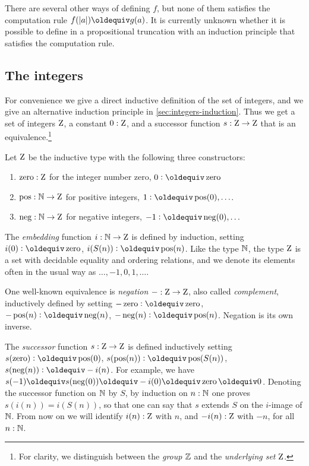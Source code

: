 \documentclass[a4paper,12pt]{amsart}
\begin{document}
There are several other ways of defining $f$, but none of them
satisfies the computation rule $f(\trunc a)\jdeq g(a)$. It is currently
unknown whether it is possible to define in {\UniMath} a propositional
truncation with an induction principle that satisfies the computation rule.


\subsection{The integers}
\label{sec:integers}

For convenience we give a direct inductive
definition of the set of integers, and we give
an alternative induction principle in \cref{sec:integers-induction}.
Thus we get a set of integers $\mathrm{Z}$, a constant $0:\mathrm{Z}$,
and a successor function $s:\mathrm{Z}\to\mathrm{Z}$
that is an equivalence.\footnote{%
  For clarity, we distinguish between the \emph{group} $\mathbb{Z}$
  and the \emph{underlying set} $\mathrm{Z}$.}

\begin{definition}\label{def:integers}
Let $\mathrm{Z}$ be the inductive type with the following three constructors:
\begin{enumerate}[topsep=0pt]
\item $\mathop{\mathrm{zero}}: \mathrm{Z}$ for the integer number zero,
$0 \defeq \zzero$
\item $\mathop{\mathrm{pos}}: \mathbb{N} \to \mathrm{Z}$ for positive {integers},
$1 \defeq \zpos(0),\ldots$.
\item $\mathop{\mathrm{neg}}: \mathbb{N} \to \mathrm{Z}$ for negative {integers},
$-1 \defeq \zneg(0),\ldots$
\end{enumerate}
\end{definition}

The \emph{embedding} function $i:\mathbb{N}\to\mathrm{Z}$ is defined by induction,
setting $i(0)\defeq \zzero$, $i(S(n))\defeq \zpos(n)$.
Like the type $\mathbb{N}$, the type $\mathrm{Z}$ is a set with decidable equality
and ordering relations,
and we denote its elements often in the usual way as $\ldots,-1,0,1,\ldots$.

One well-known equivalence is \emph{negation} ${-}:\mathrm{Z}\to\mathrm{Z}$,
also called \emph{complement}, inductively defined by setting
$-\zzero\defeq \zzero$,
$-\zpos(n)\defeq \zneg(n)$,
$-\zneg(n)\defeq \zpos(n)$.
Negation is its own inverse.

The \emph{successor} function $s:\mathrm{Z}\to\mathrm{Z}$ is defined inductively setting
$s(\zzero)\defeq \zpos(0)$,
$s(\zpos(n))\defeq \zpos(S(n))$,
$s(\zneg(n))\defeq -i(n)$. For example, we have
$s(-1)\jdeq s(\zneg(0))\jdeq -i(0) \jdeq \zzero \jdeq 0$.
{Denoting the successor function on $\mathbb{N}$ by $S$,
by} induction on $n:\mathbb{N}$ one proves $s(i(n))=i(S(n))$,
so that one can say that $s$ extends $S$ on the $i$-image of $\mathbb{N}$.
From now on we will identify $i(n):\mathrm{Z}$ with $n$,
and $-i(n):\mathrm{Z}$ with $-n$, for all $n:\mathbb{N}$.
\end{document}
